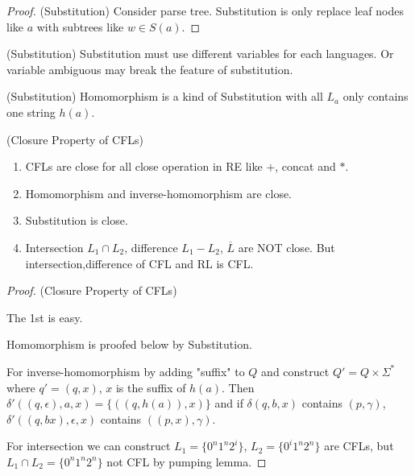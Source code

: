     \begin{proof}
        (Substitution) Consider parse tree. Substitution is only replace leaf nodes like $a$ with subtrees like $w\in S\left( a \right) $.
    \end{proof}
    \begin{remark}
        (Substitution) Substitution must use different variables for each languages. Or variable ambiguous may break the feature of substitution.
    \end{remark}
    \begin{example}
        (Substitution) Homomorphism is a kind of Substitution with all $L_{a}$ only contains one string $h\left( a \right) $.
    \end{example}
    \begin{theorem}
        (Closure Property of CFLs) 
        \begin{enumerate}
            \item CFLs are close for all close operation in RE like $+$, concat and $*$.
            \item Homomorphism and inverse-homomorphism are close.
            \item Substitution is close.
            \item Intersection $L_1\cap L_2$, difference $L_1-L_2$, $\overline{L}$ are NOT close. But intersection,difference of CFL and RL is CFL.
        \end{enumerate}
    \end{theorem}
    \begin{proof}
        (Closure Property of CFLs) 

        The 1st is easy. 

        Homomorphism is proofed below by Substitution. 

        For inverse-homomorphism by adding "suffix" to $Q$ and construct $Q'=Q\times \Sigma^{*}$ where $q'=\left( q,x \right) $, $x$ is the suffix of $h\left( a \right) $. Then $\delta'\left( \left( q,\epsilon \right) ,a,x \right) =\{\left( \left( q,h\left( a \right) \right)  ,x \right) \}$ and if $\delta\left( q,b,x \right) $ contains $\left( p,\gamma \right) $, $\delta'\left( \left( q,bx \right) ,\epsilon,x \right) $ contains $\left( \left( p,x \right) ,\gamma \right) $.

        For intersection we can construct $L_1=\{0^{n}1^{n}2^{i}\}$, $L_2=\{0^{i}1^{n}2^{n}\}$ are CFLs, but $L_1\cap L_2=\{0^{n}1^{n}2^{n}\}$ not CFL by pumping lemma.
    \end{proof}

